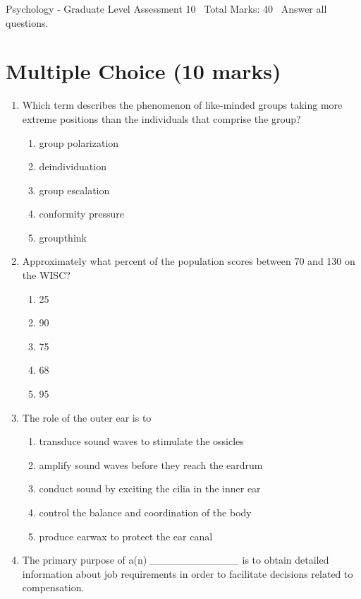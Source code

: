 \documentclass[12pt]{article}
\begin{document}
\begin{center}
Psychology - Graduate Level Assessment 10 \
Total Marks: 40 \
Answer all questions.
\end{center}

\section*{Multiple Choice (10 marks)}
\begin{enumerate}[label=\arabic*.]
\item Which term describes the phenomenon of like-minded groups taking more extreme positions than the individuals that comprise the group?
\begin{enumerate}[label=(\alph*)]
    \item group polarization
    \item deindividuation
    \item group escalation
    \item conformity pressure
    \item groupthink
\end{enumerate}
\item Approximately what percent of the population scores between 70 and 130 on the WISC?
\begin{enumerate}[label=(\alph*)]
    \item 25
    \item 90
    \item 75
    \item 68
    \item 95
\end{enumerate}
\item The role of the outer ear is to
\begin{enumerate}[label=(\alph*)]
    \item transduce sound waves to stimulate the ossicles
    \item amplify sound waves before they reach the eardrum
    \item conduct sound by exciting the cilia in the inner ear
    \item control the balance and coordination of the body
    \item produce earwax to protect the ear canal
\end{enumerate}
\item The primary purpose of a(n) \_\_\_\_\_\_\_\_\_\_\_\_ is to obtain detailed information about job requirements in order to facilitate decisions related to compensation.
\begin{enumerate}[label=(\alph*)]

\end{enumerate}
\end{enumerate}
\end{document}
